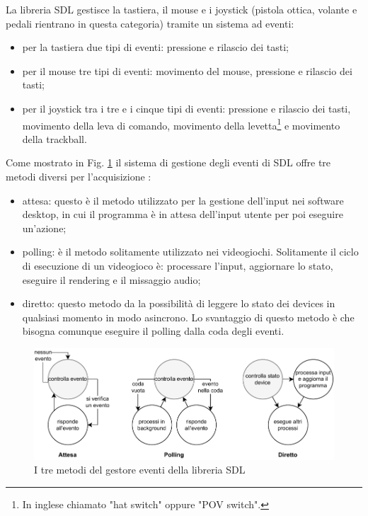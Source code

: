 La libreria SDL gestisce la tastiera, il mouse e i joystick (pistola ottica, volante e pedali rientrano in questa categoria) tramite un sistema ad eventi:

\begin{itemize}
	\item per la tastiera due tipi di eventi: pressione e rilascio dei tasti;
	\item per il mouse tre tipi di eventi: movimento del mouse, pressione e rilascio dei tasti;
	\item per il joystick tra i tre e i cinque tipi di eventi: pressione e rilascio dei tasti, movimento della leva di comando, movimento della levetta\footnote{In inglese chiamato "hat switch" oppure "POV switch".} e movimento della trackball.
\end{itemize}

Come mostrato in Fig. \ref{fig:input_event_mode} il sistema di gestione degli eventi di SDL offre tre metodi diversi per l'acquisizione \parencite{FocusOnSDL}:

\begin{itemize}	
	\item attesa: questo è il metodo utilizzato per la gestione dell'input nei software desktop, in cui il programma è in attesa dell'input utente per poi eseguire un'azione;
	\item polling: è il metodo solitamente utilizzato nei videogiochi. Solitamente il ciclo di esecuzione di un videogioco è: processare l'input, aggiornare lo stato, eseguire il rendering e il missaggio audio;
	\item diretto: questo metodo da la possibilità di leggere lo stato dei devices in qualsiasi momento in modo asincrono. Lo svantaggio di questo metodo è che bisogna comunque eseguire il polling dalla coda degli eventi.
\end{itemize}

\begin{figure}[H]
	\includegraphics[width=\linewidth]{immagini/input_event_mode}
	\caption{I tre metodi del gestore eventi della libreria SDL}
	\label{fig:input_event_mode}
\end{figure}

